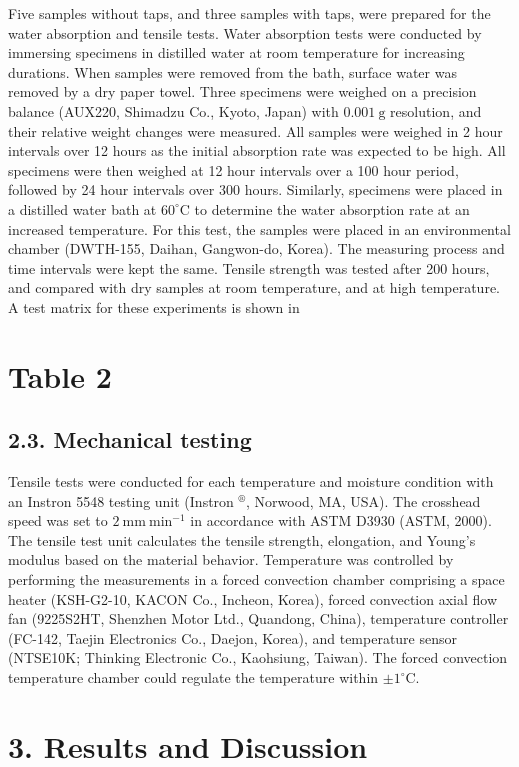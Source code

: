 \documentclass[10pt]{article}
\begin{document}
Five samples without taps, and three samples with taps, were prepared for the water absorption and tensile tests. Water absorption tests were conducted by immersing specimens in distilled water at room temperature for increasing durations. When samples were removed from the bath, surface water was removed by a dry paper towel. Three specimens were weighed on a precision balance (AUX220, Shimadzu Co., Kyoto, Japan) with $0.001 \mathrm{~g}$ resolution, and their relative weight changes were measured. All samples were weighed in 2 hour intervals over 12 hours as the initial absorption rate was expected to be high. All specimens were then weighed at 12 hour intervals over a 100 hour period, followed by 24 hour intervals over 300 hours. Similarly, specimens were placed in a distilled water bath at $60^{\circ} \mathrm{C}$ to determine the water absorption rate at an increased temperature. For this test, the samples were placed in an environmental chamber (DWTH-155, Daihan, Gangwon-do, Korea). The measuring process and time intervals were kept the same. Tensile strength was tested after 200 hours, and compared with dry samples at room temperature, and at high temperature. A test matrix for these experiments is shown in

\section*{Table 2}
\subsection*{2.3. Mechanical testing}
Tensile tests were conducted for each temperature and moisture condition with an Instron 5548 testing unit (Instron ${ }^{\circledR}$, Norwood, MA, USA). The crosshead speed was set to $2 \mathrm{~mm} \mathrm{~min}^{-1}$ in accordance with ASTM D3930 (ASTM, 2000). The tensile test unit calculates the tensile strength, elongation, and Young's modulus based on the material behavior. Temperature was controlled by performing the measurements in a forced convection chamber comprising a space heater (KSH-G2-10, KACON Co., Incheon, Korea), forced convection axial flow fan (9225S2HT, Shenzhen Motor Ltd., Quandong, China), temperature controller (FC-142, Taejin Electronics Co., Daejon, Korea), and temperature sensor (NTSE10K; Thinking Electronic Co., Kaohsiung, Taiwan). The forced convection temperature chamber could regulate the temperature within $\pm 1^{\circ} \mathrm{C}$.

\section*{3. Results and Discussion}
\end{document}
